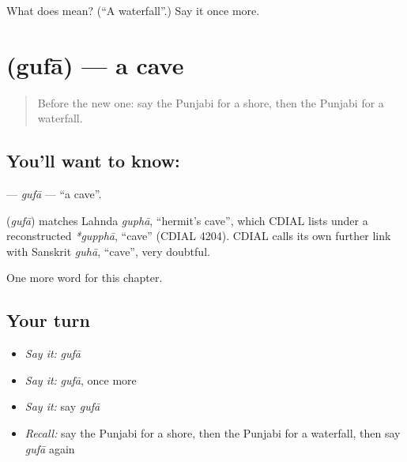 \begin{tcolorbox}[breakable,colback=teal!4,colframe=teal!35!black,title={Before you move on}]
What does  mean? (\textquotedblleft{}A waterfall\textquotedblright{}.) Say it once more.
\end{tcolorbox}
\section[\texorpdfstring{\pa{ਗੁਫ਼ਾ} (gufā)}{ਗੁਫ਼ਾ (gufā)}]{ (gufā) — a cave}

\label{lesson:PA-C127-gufa}



\begin{quote}
Before the new one: say the Punjabi for a shore, then the Punjabi for a waterfall.
\end{quote}

\subsection*{You'll want to know: }
\textbf{} — \emph{gufā} — \textquotedblleft{}a cave\textquotedblright{}.

\begin{cousinweb}
\textbf{} (\emph{gufā}) matches Lahnda \emph{guphā}, \textquotedblleft{}hermit's cave\textquotedblright{}, which CDIAL lists under a reconstructed \emph{*gupphā}, \textquotedblleft{}cave\textquotedblright{} (CDIAL 4204). CDIAL calls its own further link with Sanskrit \emph{guhā}, \textquotedblleft{}cave\textquotedblright{}, very doubtful.
\end{cousinweb}

\begin{grammarlens}[title={What you've built}]
One more word for this chapter.
\end{grammarlens}

\subsection*{Your turn}
\begin{itemize}
\raggedright
  \item \emph{Say it:} \emph{gufā}
  \item \emph{Say it:} \emph{gufā}, once more
  \item \emph{Say it:} say \emph{gufā}
  \item \emph{Recall:} say the Punjabi for a shore, then the Punjabi for a waterfall, then say \emph{gufā} again
\end{itemize}

